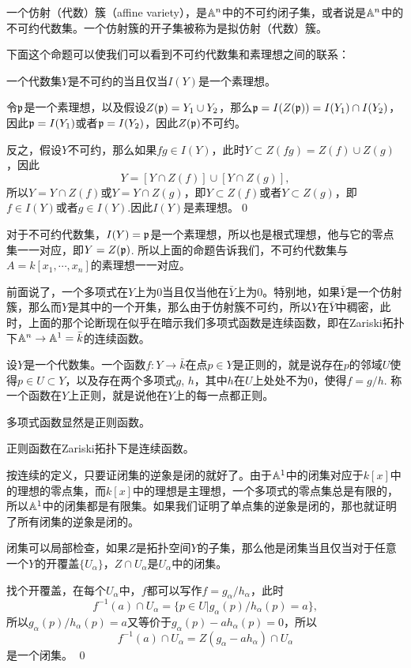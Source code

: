 \para 一个仿射（代数）簇（affine variety），是$\mathbb{A}^n$中的不可约闭子集，或者说是$\mathbb{A}^n$中的不可约代数集。一个仿射簇的开子集被称为是拟仿射（代数）簇。

下面这个命题可以使我们可以看到不可约代数集和素理想之间的联系：

\pro 一个代数集$Y$是不可约的当且仅当$I(Y)$是一个素理想。

\proof 令$\mathfrak{p}$是一个素理想，以及假设$Z(\mathfrak{p})=Y_1\cup Y_2$，那么$\mathfrak{p}=I(Z(\mathfrak{p}))=I(Y_1)\cap I(Y_2)$，因此$\mathfrak{p}=I(Y_1)$或者$\mathfrak{p}=I(Y_2)$，因此$Z(\mathfrak{p})$不可约。

反之，假设$Y$不可约，那么如果$fg\in I(Y)$，此时$Y\subset Z(fg)=Z(f)\cup Z(g)$，因此
\[
	Y=[Y\cap Z(f)]\cup [Y\cap Z(g)],
\]
所以$Y=Y\cap Z(f)$或$Y=Y\cap Z(g)$，即$Y\subset Z(f)$或者$Y\subset Z(g)$，即$f\in I(Y)$或者$g\in I(Y)$.因此$I(Y)$是素理想。\qed

对于不可约代数集，$I(Y)=\mathfrak{p}$是一个素理想，所以也是根式理想，他与它的零点集一一对应，即$Y=Z(\mathfrak{p})$. 所以上面的命题告诉我们，不可约代数集与$A=k[x_1,\cdots,x_n]$的素理想一一对应。

前面说了，一个多项式在$Y$上为$0$当且仅当他在$\bar{Y}$上为$0$。特别地，如果$\bar{Y}$是一个仿射簇，那么而$Y$是其中的一个开集，那么由于仿射簇不可约，所以$Y$在$\bar{Y}$中稠密，此时，上面的那个论断现在似乎在暗示我们多项式函数是连续函数，即在Zariski拓扑下$\mathbb{A}^n\to \mathbb{A}^1=\bar{k}$的连续函数。

\para 设$Y$是一个代数集。一个函数$f:Y\to \bar{k}$在点$p\in Y$是正则的，就是说存在$p$的邻域$U$使得$p\in U\subset Y$，以及存在两个多项式$g$, $h$，其中$h$在$U$上处处不为$0$，使得$f=g/h$. 称一个函数在$Y$上正则，就是说他在$Y$上的每一点都正则。

多项式函数显然是正则函数。

\pro 正则函数在Zariski拓扑下是连续函数。

\proof
	按连续的定义，只要证闭集的逆象是闭的就好了。由于$\mathbb{A}^1$中的闭集对应于$k[x]$中的理想的零点集，而$k[x]$中的理想是主理想，一个多项式的零点集总是有限的，所以$\mathbb{A}^1$中的闭集都是有限集。如果我们证明了单点集的逆象是闭的，那也就证明了所有闭集的逆象是闭的。

	闭集可以局部检查，如果$Z$是拓扑空间$Y$的子集，那么他是闭集当且仅当对于任意一个$Y$的开覆盖$\{U_\alpha\}$，$Z\cap U_\alpha$是$U_\alpha$中的闭集。

	找个开覆盖，在每个$U_\alpha$中，$f$都可以写作$f=g_\alpha/h_\alpha$，此时
	\[
		f^{-1}(a)\cap U_\alpha=\bigl\{p\in U| g_\alpha(p)/h_\alpha(p)=a\bigr\},
	\]
	所以$g_\alpha(p)/h_\alpha(p)=a$又等价于$g_\alpha(p)-ah_\alpha(p)=0$，所以
	\[
		f^{-1}(a)\cap U_\alpha=Z(g_\alpha-ah_\alpha)\cap U_\alpha
	\]
	是一个闭集。
\qed